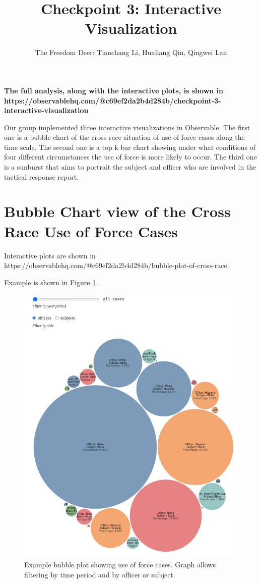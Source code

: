 \documentclass[10pt]{article}
\title{Checkpoint 3: Interactive Visualization}
\author{The Freedom Deer: Tianchang Li, Hualiang Qin, Qingwei Lan}
\begin{document}
\maketitle


\textbf{The full analysis, along with the interactive plots, is shown in \\ https://observablehq.com/@c69ef2da2b4d284b/checkpoint-3-interactive-visualization}

Our group implemented three interactive visualizations in Observable. The first one is a bubble chart of the cross race situation of use of force cases along the time scale. The second one is a top k bar chart showing under what conditions of four different circumstances the use of force is more likely to occur. The third one is a sunburst that aims to portrait the subject and officer who are involved in the tactical response report.

\section{Bubble Chart view of the Cross Race Use of Force Cases}

Interactive plots are shown in \\ https://observablehq.com/@c69ef2da2b4d284b/bubble-plot-of-cross-race.

Example is shown in Figure \ref{bubbleplot-officer}.

\begin{figure}[h]
\centering
\includegraphics[scale=0.47]{bubbleplot-officer}
\caption{Example bubble plot showing use of force cases. Graph allows filtering by time period and by officer or subject.}
\label{bubbleplot-officer}
\end{figure}
\end{document}
